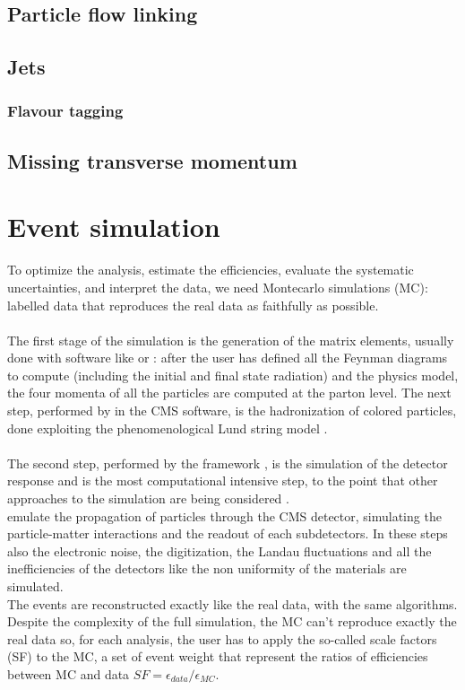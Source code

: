 \subsection{Particle flow linking}
\subsection{Jets}
\subsubsection*{Flavour tagging}
\subsection{Missing transverse momentum}

\section{Event simulation}
To optimize the analysis, estimate the efficiencies, evaluate the systematic uncertainties, and interpret the data, we need Montecarlo simulations (MC): labelled data that reproduces the real data as faithfully as possible.\\
\\
The first stage of the simulation is the generation of the matrix elements, usually done with software like \MADGRAPH \ADDREF or \POWHEG \ADDREF : after the user has defined all the Feynman diagrams to compute (including the initial and final state radiation) and the physics model, the four momenta of all the particles are computed at the parton level.
The next step, performed by \PYTHIA \ADDREF in the CMS software, is the hadronization of colored particles, done exploiting the phenomenological Lund string model \ADDREF .\\
\\
The second step, performed by the \GEANTfour framework \ADDREF, is the simulation of the detector response and is the most computational intensive step, to the point that other approaches to the simulation are being considered \ADDREF .\\
\GEANT emulate the propagation of particles through the CMS detector, simulating the particle-matter interactions and the readout of each subdetectors. In these steps also the electronic noise, the digitization, the Landau fluctuations and all the inefficiencies of the detectors like the non uniformity of the materials are simulated.\\
The events are reconstructed exactly like the real data, with the same algorithms.\\
Despite the complexity of the full simulation, the MC can't reproduce exactly the real data so, for each analysis, the user has to apply the so-called scale factors (SF) to the MC, a set of event weight that represent the ratios of efficiencies between MC and data $SF=\epsilon_{data}/\epsilon_{MC}$.

